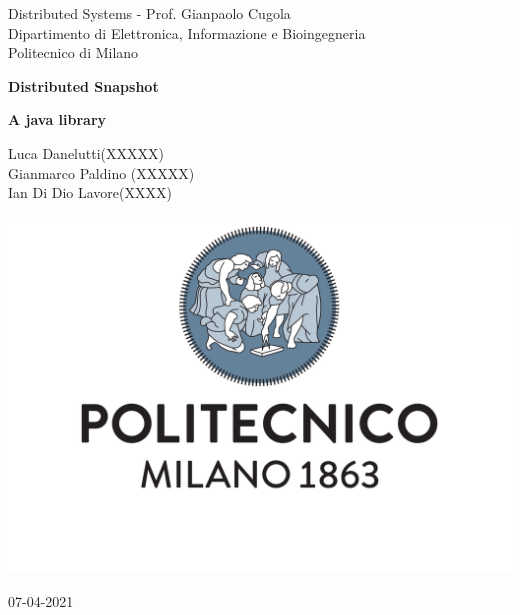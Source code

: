 \documentclass[a4paper]{article}
\begin{document}
    \begin{titlepage}
        \centering

        {\normalsize
            Distributed Systems - Prof. Gianpaolo Cugola \\
            Dipartimento di Elettronica, Informazione e Bioingegneria \\
            Politecnico di Milano \par
        }     \vspace{3cm}

        {\Huge \textbf{Distributed Snapshot\\} }    \vspace{1cm}

        {\large \textbf{A java library} \par}     \vspace{4cm}

        {\normalsize Luca Danelutti(XXXXX) \\ Gianmarco Paldino (XXXXX)\\ Ian Di Dio Lavore(XXXX)\par}     \vspace{3cm}

        \includegraphics[scale=0.4]{images/logo}
        \vspace{0.5cm}


        {\normalsize 07-04-2021 \par}

    \end{titlepage}

    \tableofcontents

    
\end{document}
